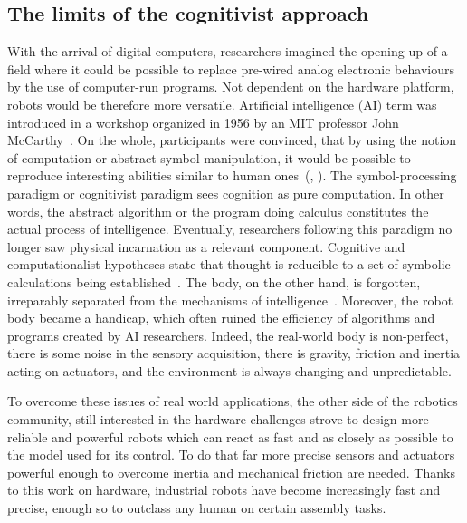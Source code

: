 \subsection{The limits of the cognitivist approach} %


With the arrival of digital computers, researchers imagined the opening up of a field where it could be possible to replace pre-wired analog electronic behaviours by the use of computer-run programs. Not dependent on the hardware platform, robots would be therefore more versatile.
Artificial intelligence (AI) term was introduced in a workshop organized in 1956 by an MIT professor John McCarthy~\parencite{mccarthy1978history}. On the whole, participants were convinced, that by using the notion of computation or abstract symbol manipulation, it would be possible to reproduce interesting abilities similar to human ones~(\cite{kaufmann1979machines}, \cite{haugeland1989artificial}). The symbol-processing paradigm or cognitivist paradigm sees cognition as pure computation. In other words, the abstract algorithm or the program doing calculus constitutes the actual process of intelligence. Eventually, researchers following this paradigm no longer saw physical incarnation as a relevant component. Cognitive and computationalist hypotheses state that thought is reducible to a set of symbolic calculations being established~\parencite{fodor1987psychosemantics}. The body, on the other hand, is forgotten, irreparably separated from the mechanisms of intelligence~\parencite{kaplan2008corps}.
Moreover, the robot body became a handicap, which often ruined the efficiency of algorithms and programs created by AI researchers. Indeed, the real-world body is non-perfect, there is some noise in the sensory acquisition, there is gravity, friction and inertia acting on actuators, and the environment is always changing and unpredictable.

To overcome these issues of real world applications, the other side of the robotics community, still interested in the hardware challenges strove to design more reliable and powerful robots which can react as fast and as closely as possible to the model used for its control. To do that far more precise sensors and actuators powerful enough to overcome inertia and mechanical friction are needed. Thanks to this work on hardware, industrial robots have become increasingly fast and precise, enough so to outclass any human on certain assembly tasks.


